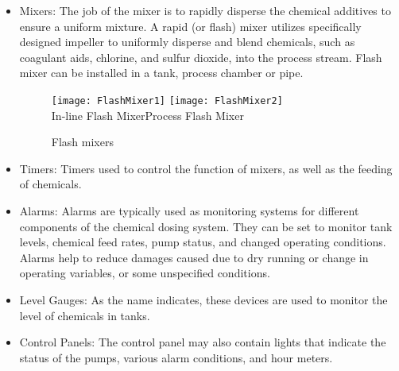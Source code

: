 \begin{itemize}
\item Mixers: The job of the mixer is to rapidly disperse the chemical additives to ensure a uniform mixture.  A rapid (or flash) mixer utilizes specifically designed impeller to uniformly disperse and blend chemicals, such as coagulant aids, chlorine, and sulfur dioxide, into the process stream.  Flash mixer can be installed in a tank, process chamber or pipe.
\begin{figure}[H]
\begin{center}
\texttt{[image: FlashMixer1]} \hspace{3 cm}\texttt{[image: FlashMixer2]}\\
\vspace{0.2cm}
\hspace{1 cm}In-line Flash Mixer\hspace{4.5 cm}Process Flash Mixer
\caption{Flash mixers}
\end{center}
\end{figure}
\item Timers: Timers used to control the function of mixers, as well as the feeding of chemicals.
\item Alarms: Alarms are typically used as monitoring systems for different components of the chemical dosing system. They can be set to monitor tank levels, chemical feed rates, pump status, and changed operating conditions. Alarms help to reduce damages caused due to dry running or change in operating variables, or some unspecified conditions.
\item Level Gauges: As the name indicates, these devices are used to monitor the level of chemicals in tanks.
\item Control Panels: The control panel may also contain lights that indicate the status of the pumps, various alarm conditions, and hour meters.
\end{itemize}


